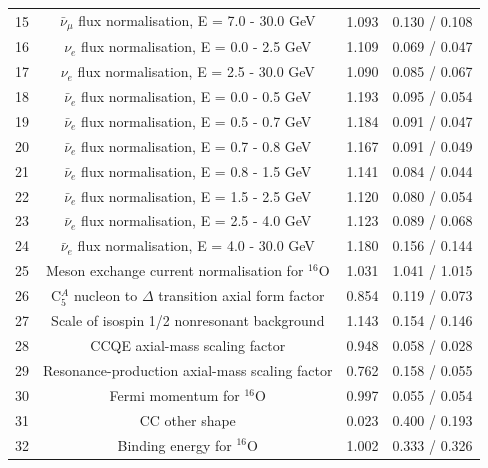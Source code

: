 {\begin{table}
\begin{tabular}{| c | c | c | c |}
           15 &  $\bar{\nu}_{\mu}$ flux normalisation, E = 7.0 - 30.0 GeV        & 1.093   & 0.130 / 0.108 \\ 
           16 &  $\nu_{e}$ flux normalisation, E = 0.0 - 2.5 GeV                 & 1.109   & 0.069 / 0.047 \\ 
           17 &  $\nu_{e}$ flux normalisation, E = 2.5 - 30.0 GeV                & 1.090   & 0.085 / 0.067 \\ 
           18 &  $\bar{\nu}_{e}$ flux normalisation, E = 0.0 - 0.5 GeV           & 1.193   & 0.095 / 0.054 \\ 
           19 &  $\bar{\nu}_{e}$ flux normalisation, E = 0.5 - 0.7 GeV           & 1.184   & 0.091 / 0.047 \\ 
           20 &  $\bar{\nu}_{e}$ flux normalisation, E = 0.7 - 0.8 GeV           & 1.167   & 0.091 / 0.049 \\ 
           21 &  $\bar{\nu}_{e}$ flux normalisation, E = 0.8 - 1.5 GeV           & 1.141   & 0.084 / 0.044 \\ 
           22 &  $\bar{\nu}_{e}$ flux normalisation, E = 1.5 - 2.5 GeV           & 1.120   & 0.080 / 0.054 \\ 
           23 &  $\bar{\nu}_{e}$ flux normalisation, E = 2.5 - 4.0 GeV           & 1.123   & 0.089 / 0.068 \\ 
           24 &  $\bar{\nu}_{e}$ flux normalisation, E = 4.0 - 30.0 GeV          & 1.180   & 0.156 / 0.144 \\ 
           25 &  Meson exchange current normalisation for $^{16}$O               & 1.031   & 1.041 / 1.015 \\ 
           26 &  C$^{A}_{5}$ nucleon to $\Delta$ transition axial form factor    & 0.854   & 0.119 / 0.073 \\ 
           27 &  Scale of isospin 1/2 nonresonant background                     & 1.143   & 0.154 / 0.146 \\ 
           28 &  CCQE axial-mass scaling factor                                  & 0.948   & 0.058 / 0.028 \\ 
           29 &  Resonance-production axial-mass scaling factor                  & 0.762   & 0.158 / 0.055 \\ 
           30 &  Fermi momentum for $^{16}$O                                     & 0.997   & 0.055 / 0.054 \\ 
           31 &  CC other shape                                                  & 0.023   & 0.400 / 0.193 \\ 
           32 &  Binding energy for $^{16}$O                                     & 1.002   & 0.333 / 0.326 \\ 

\end{tabular}
\end{table}}
